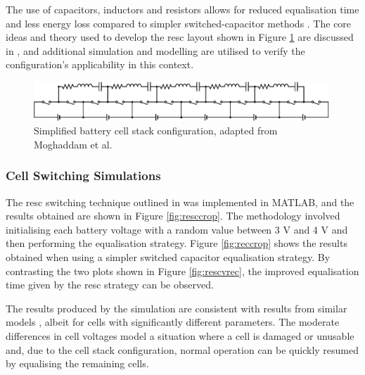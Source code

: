 The use of capacitors, inductors and resistors allows for reduced equalisation time and less energy loss compared to simpler switched-capacitor methods \cite{8467638}. The core ideas and theory used to develop the \gls{resc} layout shown in Figure \ref{fig:bcs} are discussed in \cite{8681672}, and additional simulation and modelling are utilised to verify the configuration's applicability in this context.

\begin{figure}[H]
\centering
\vspace{5mm}
\includegraphics[width=0.99\textwidth]{figs/Samuel/Figures/resc1-cropped.pdf}
\caption[Simplified Battery Cell Stack Configuration]{Simplified battery cell stack configuration, adapted from Moghaddam et al. \cite{8467638}}
\label{fig:bcs}
\end{figure}

\subsubsection{Cell Switching Simulations}
\label{swit}

The \gls{resc} switching technique outlined in \cite{8467638} was implemented in MATLAB, and the results obtained are shown in Figure \ref{fig:resccrop}. The methodology involved initialising each battery voltage with a random value between 3 V and 4 V and then performing the equalisation strategy. Figure \ref{fig:reccrop} shows the results obtained when using a simpler switched capacitor equalisation strategy. By contrasting the two plots shown in Figure \ref{fig:rescvrec}, the improved equalisation time given by the \gls{resc} strategy can be observed. 

The results produced by the simulation are consistent with results from similar models \cite{8467638}, albeit for cells with significantly different parameters. The moderate differences in cell voltages model a situation where a cell is damaged or unusable and, due to the cell stack configuration, normal operation can be quickly resumed by equalising the remaining cells.

